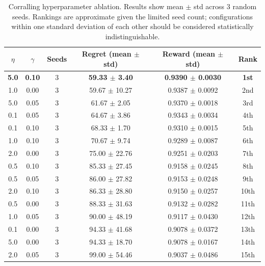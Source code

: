 \begin{table}[h]
\centering
\caption{Corralling hyperparameter ablation. Results show mean $\pm$ std
across 3 random seeds. Rankings are approximate given the limited seed count;
configurations within one standard deviation of each other should be considered
statistically indistinguishable.}
\label{tab:corralling_ablation}
\small
\begin{tabular}{cccccc}
\toprule
$\eta$ & $\gamma$ & Seeds & Regret (mean $\pm$ std) & Reward (mean $\pm$ std) & Rank \\
\midrule
\textbf{5.0} & \textbf{0.10} & 3 & \textbf{59.33 $\pm$ 3.40} & \textbf{0.9390 $\pm$ 0.0030} & \textbf{1st} \\
1.0 & 0.00 & 3 & 59.67 $\pm$ 10.27 & 0.9387 $\pm$ 0.0092 & 2nd \\
5.0 & 0.05 & 3 & 61.67 $\pm$ 2.05 & 0.9370 $\pm$ 0.0018 & 3rd \\
0.1 & 0.05 & 3 & 64.67 $\pm$ 3.86 & 0.9343 $\pm$ 0.0034 & 4th \\
0.1 & 0.10 & 3 & 68.33 $\pm$ 1.70 & 0.9310 $\pm$ 0.0015 & 5th \\
1.0 & 0.10 & 3 & 70.67 $\pm$ 9.74 & 0.9289 $\pm$ 0.0087 & 6th \\
2.0 & 0.00 & 3 & 75.00 $\pm$ 22.76 & 0.9251 $\pm$ 0.0203 & 7th \\
0.5 & 0.10 & 3 & 85.33 $\pm$ 27.45 & 0.9158 $\pm$ 0.0245 & 8th \\
0.5 & 0.05 & 3 & 86.00 $\pm$ 27.82 & 0.9153 $\pm$ 0.0248 & 9th \\
2.0 & 0.10 & 3 & 86.33 $\pm$ 28.80 & 0.9150 $\pm$ 0.0257 & 10th \\
0.5 & 0.00 & 3 & 88.33 $\pm$ 31.63 & 0.9132 $\pm$ 0.0282 & 11th \\
1.0 & 0.05 & 3 & 90.00 $\pm$ 48.19 & 0.9117 $\pm$ 0.0430 & 12th \\
0.1 & 0.00 & 3 & 94.33 $\pm$ 41.68 & 0.9078 $\pm$ 0.0372 & 13th \\
5.0 & 0.00 & 3 & 94.33 $\pm$ 18.70 & 0.9078 $\pm$ 0.0167 & 14th \\
2.0 & 0.05 & 3 & 99.00 $\pm$ 54.46 & 0.9037 $\pm$ 0.0486 & 15th \\
\bottomrule
\end{tabular}
\end{table}

